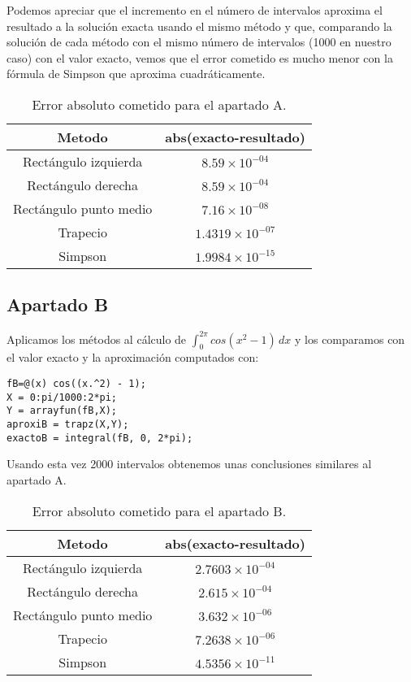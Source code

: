 Podemos apreciar que el incremento en el número de intervalos aproxima el resultado a la solución exacta usando el mismo método y que, comparando la solución de cada método con el mismo número de intervalos (1000 en nuestro caso) con el valor exacto, vemos que el error cometido es mucho menor con la fórmula de Simpson que aproxima cuadráticamente.
\begin{table}
\begin{center}
\begin{tabular}{ |c|c| } 
 \hline 
 Metodo & abs(exacto-resultado) \\ 
 \hline \hline
 Rectángulo izquierda &  $8.59\times10^{-04}$ \\ 
 \hline
 Rectángulo derecha &  $8.59\times10^{-04}$ \\ 
 \hline
 Rectángulo punto medio &  $7.16\times10^{-08}$ \\ 
 \hline
 Trapecio &  $1.4319\times10^{-07}$ \\ 
 \hline
 Simpson &  $1.9984\times10^{-15}$ \\ 
 \hline
\end{tabular}
\end{center}
\caption{Error absoluto cometido para el apartado A.}
\end{table}


\subsection{Apartado B}
Aplicamos los métodos al cálculo de \(\int_{0}^{2\pi} cos(x^2 - 1) \,dx\) y los comparamos con el valor exacto y la aproximación computados con:
\begin{lstlisting}
fB=@(x) cos((x.^2) - 1);
X = 0:pi/1000:2*pi;
Y = arrayfun(fB,X);
aproxiB = trapz(X,Y);
exactoB = integral(fB, 0, 2*pi);
\end{lstlisting}

Usando esta vez 2000 intervalos obtenemos unas conclusiones similares al apartado A.
\begin{table}
\begin{center}
\begin{tabular}{ |c|c| } 
 \hline 
 Metodo & abs(exacto-resultado) \\ 
 \hline \hline
 Rectángulo izquierda &  $2.7603\times10^{-04}$ \\ 
 \hline
 Rectángulo derecha &  $2.615\times10^{-04}$ \\ 
 \hline
 Rectángulo punto medio &  $3.632\times10^{-06}$ \\ 
 \hline
 Trapecio &  $7.2638\times10^{-06}$ \\ 
 \hline
 Simpson &  $4.5356\times10^{-11}$ \\ 
 \hline
\end{tabular}
\end{center}
\caption{Error absoluto cometido para el apartado B.}
\end{table}